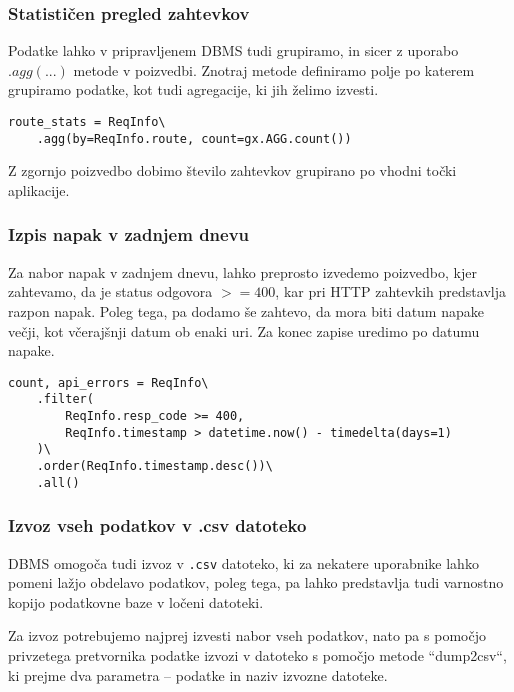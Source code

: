 \documentclass[a4paper,12pt,openright]{book}
\begin{document}
    \newpage
    \subsubsection{Statističen pregled zahtevkov}

    Podatke lahko v pripravljenem DBMS tudi grupiramo, in sicer z uporabo $.agg(...)$ metode v poizvedbi. Znotraj metode definiramo polje po katerem grupiramo podatke, kot tudi agregacije, ki jih želimo izvesti.
    
\begin{verbatim}
route_stats = ReqInfo\
    .agg(by=ReqInfo.route, count=gx.AGG.count())
\end{verbatim}

    \noindent
    Z zgornjo poizvedbo dobimo število zahtevkov grupirano po vhodni točki aplikacije. 

    \subsubsection{Izpis napak v zadnjem dnevu}

    Za nabor napak v zadnjem dnevu, lahko preprosto izvedemo poizvedbo, kjer zahtevamo, da je status odgovora $>= 400$, kar pri HTTP zahtevkih predstavlja razpon napak. Poleg tega, pa dodamo še zahtevo, da mora biti datum napake večji, kot včerajšnji datum ob enaki uri. Za konec zapise uredimo po datumu napake.
    
\begin{verbatim}
count, api_errors = ReqInfo\
    .filter(
        ReqInfo.resp_code >= 400,
        ReqInfo.timestamp > datetime.now() - timedelta(days=1)
    )\
    .order(ReqInfo.timestamp.desc())\
    .all()
\end{verbatim}

    \subsubsection{Izvoz vseh podatkov v .csv datoteko}

    DBMS omogoča tudi izvoz v {\tt.csv} datoteko, ki za nekatere uporabnike lahko pomeni lažjo obdelavo podatkov, poleg tega, pa lahko predstavlja tudi varnostno kopijo podatkovne baze v ločeni datoteki.

    Za izvoz potrebujemo najprej izvesti nabor vseh podatkov, nato pa s pomočjo privzetega pretvornika podatke izvozi v datoteko s pomočjo metode ``dump2csv``, ki prejme dva parametra – podatke in naziv izvozne datoteke.
    
\end{document}
